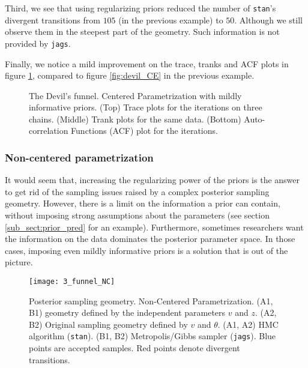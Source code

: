 Third, we see that using regularizing priors reduced the number of \texttt{stan}'s divergent transitions from $105$ (in the previous example) to $50$. Although we still observe them in the steepest part of the geometry. Such information is not provided by \texttt{jags}.

Finally, we notice a mild improvement on the trace, tranks and ACF plots in figure \ref{fig:devil_prior}, compared to figure \ref{fig:devil_CE} in the previous example.
%
\begin{figure}[h] 
	\centering
	\begin{subfigure}
		\texttt{[image: 2\_trace\_CE\_priors]}
	\end{subfigure}
	\begin{subfigure}
		\texttt{[image: 2\_trank\_CE\_priors]}
	\end{subfigure}
	\begin{subfigure}
		\texttt{[image: 2\_acf\_CE\_priors]}
	\end{subfigure}
	\caption[The Devil's funnel. Centered Parametrization with prior information.]%
	{The Devil's funnel. Centered Parametrization with mildly informative priors. (Top) Trace plots for the iterations on three chains. (Middle) Trank plots for the same data. (Bottom) Auto-correlation Functions (ACF) plot for the iterations.}
	\label{fig:devil_prior}
\end{figure}


\subsubsection{Non-centered parametrization} \label{subsub_sec:NCP}

It would seem that, increasing the regularizing power of the priors is the answer to get rid of the sampling issues raised by a complex posterior sampling geometry. However, there is a limit on the information a prior can contain, without imposing strong assumptions about the parameters (see section \ref{sub_sect:prior_pred} for an example). Furthermore, sometimes researchers want the information on the data dominates the posterior parameter space. In those cases, imposing even mildly informative priors is a solution that is out of the picture.
%
\begin{figure}[h]
	\centering
	\texttt{[image: 3\_funnel\_NC]}
	\caption[Posterior sampling geometry. Non-Centered Parametrization.]%
	{Posterior sampling geometry. Non-Centered Parametrization. (A1, B1) geometry defined by the independent parameters $v$ and $z$. (A2, B2) Original sampling geometry defined by $v$ and $\theta$. (A1, A2) HMC algorithm (\texttt{stan}). (B1, B2) Metropolis/Gibbs sampler (\texttt{jags}). Blue points are accepted samples. Red points denote divergent transitions.}
	\label{fig:devil_NC_geom}
\end{figure}


